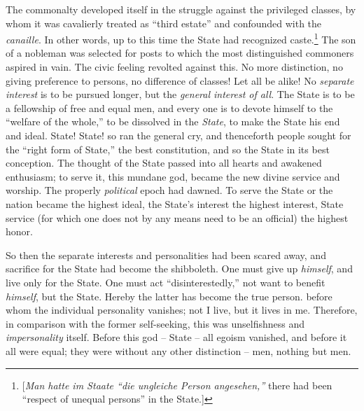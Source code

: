 \documentclass[12pt,a4paper]{book}
\begin{document}
The commonalty developed itself in the struggle against the privileged 
classes, by whom it was cavalierly treated as ``third estate'' and 
confounded with the \textit{canaille}. In other words, up to this time the 
State had recognized caste.\footnote{[\textit{Man hatte im Staate ``die 
ungleiche Person angesehen,''} there had been ``respect of unequal 
persons'' in the State.]} The son of a nobleman was selected for posts to 
which the most distinguished commoners aspired in vain. The civic feeling 
revolted against this. No more distinction, no giving preference to persons, 
no difference of classes! Let all be alike! No \textit{separate interest} is 
to be pursued longer, but the \textit{general interest of all}. The State is 
to be a fellowship of free and equal men, and every one is to devote himself 
to the ``welfare of the whole,'' to be dissolved in the \textit{State}, to 
make the State his end and ideal. State! State! so ran the general cry, and 
thenceforth people sought for the ``right form of State,'' the best 
constitution, and so the State in its best conception. The thought of the 
State passed into all hearts and awakened enthusiasm; to serve it, this 
mundane god, became the new divine service and worship. The properly 
\textit{political} epoch had dawned. To serve the State or the nation became 
the highest ideal, the State's interest the highest interest, State service 
(for which one does not by any means need to be an official) the highest 
honor.

So then the separate interests and personalities had been scared away, and 
sacrifice for the State had become the shibboleth. One must give up 
\textit{himself}, and live only for the State. One must act 
``disinterestedly,'' not want to benefit \textit{himself}, but the State. 
Hereby the latter has become the true person. before whom the individual 
personality vanishes; not I live, but it lives in me. Therefore, in comparison 
with the former self-seeking, this was unselfishness and 
\textit{impersonality} itself. Before this god -- State -- all egoism 
vanished, and before it all were equal; they were without any other 
distinction -- men, nothing but men.
\end{document}
